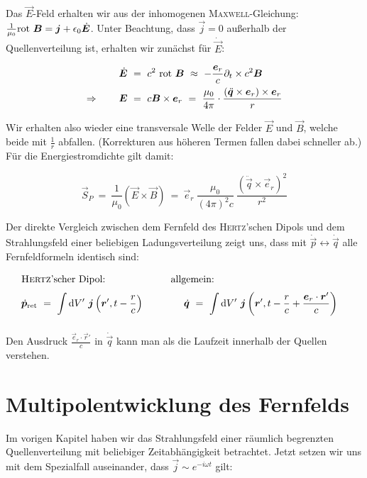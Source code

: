 Das $\vec{E}$-Feld erhalten wir aus der inhomogenen \textsc{Maxwell}-Gleichung: $\frac{1}{\mu_0}\text{rot }\bm{B}= \bm{j} + \epsilon_0\dot{\bm{E}}$. Unter Beachtung, dass $\vec{j}=0$ außerhalb der Quellenverteilung ist, erhalten wir zunächst für $\dot{\vec{E}}$:

\begin{align*}
\dot{\vec{E}}  \ &= \ c^2 \ \rot\vec{B} \ \approx \ - \frac{\vec{e}_r}{c}\partial_t\times c^2 \vec{B}\\
\Rightarrow\qquad \vec{E} \ &= \ c\vec{B}\times\vec{e}_r  \ = \ \frac{\mu_0}{4\pi} \cdot \frac{\left(\ddot{\vec{q}}\times\vec{e}_r\right)\times\vec{e}_r}{r}
\end{align*}

Wir erhalten also wieder eine transversale Welle der Felder $\vec{E}$ und $\vec{B}$, welche beide mit $\frac{1}{r}$ abfallen. (Korrekturen aus höheren Termen fallen dabei schneller ab.)\\
Für die Energiestromdichte gilt damit:

\begin{equation*}
\vec{S}_P \ = \ \frac{1}{\mu_0} (\vec{E}\times\vec{B})  \ = \  \vec{e}_r \ \frac{\mu_0}{(4\pi)^2 c} \ \frac{\left(\ddot{\vec{q}}\times\vec{e}_r\right)^2}{r^2}
\end{equation*}

Der direkte Vergleich zwischen dem Fernfeld des \textsc{Hertz}'schen Dipols und dem Strahlungsfeld einer beliebigen Ladungsverteilung zeigt uns, dass mit $\dot{\vec{p}}\leftrightarrow\dot{\vec{q}}$ alle Fernfeldformeln identisch sind:

\begin{align*}
&\text{\textsc{Hertz}'scher Dipol:} \qquad\qquad\qquad\ \; \text{allgemein:}&\\
&\dot{\vec{p}}_{\text{ret}}  \ = \ \Int{}{}{V'} \vec{j}\left(\vec{r}',t-\frac{r}{c}\right) \qquad \qquad \dot{\vec{q}}  \ = \ \Int{}{}{V'}\vec{j}\left(\vec{r}',t-\frac{r}{c}+\frac{\vec{e}_r\cdot\vec{r}'}{c}\right)
\end{align*}

Den Ausdruck $\frac{\vec{e}_r\cdot\vec{r}'}{c}$ in $\dot{\vec{q}}$ kann man als die Laufzeit innerhalb der Quellen verstehen.


\section{Multipolentwicklung des Fernfelds}

Im vorigen Kapitel haben wir das Strahlungsfeld einer räumlich begrenzten Quellenverteilung mit beliebiger Zeitabhängigkeit betrachtet. Jetzt setzen wir uns mit dem Spezialfall auseinander, dass $\vec{j}\sim e^{-i\omega t}$ gilt:

